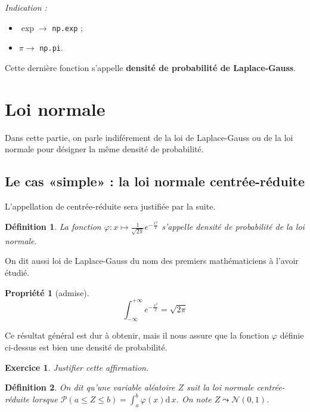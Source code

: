 \documentclass[11pt,a4paper,french]{article}
\makeatletter
\renewcommand{\maketitle}%
{\framebox{%
    \begin{minipage}{1.0\linewidth}%
      \begin{center}%
        \Large \@title ~-- \@author \\%
        \@date%
      \end{center}%
    \end{minipage}}%
  \normalsize%
}
\newcommand{\diff}[1]{\mathrm{d}\,#1}
\newcommand{\p}{\mathcal{P}}
\theoremstyle{break}
\newtheorem{definition}{Définition}
\newtheorem{propriete}{Propriété}
\theoremstyle{plain}
\newtheorem{exerciceT}{Exercice}
\theoremstyle{nonumberplain}
\theoremstyle{nonumberbreak}
\newenvironment{exercice}{\begin{framed}\begin{exerciceT}}{\end{exerciceT}\end{framed}}
\makeatother
\begin{document}
\emph{Indication :}
\begin{itemize}
  \item $\exp \to$ \texttt{np.exp} ;
  \item $\pi \to$ \texttt{np.pi}.
\end{itemize}

Cette dernière fonction s'appelle \textbf{densité de probabilité de
Laplace-Gauss}.
\pagebreak

\maketitle

\section{Loi normale}

Dans cette partie, on parle indiférement de la loi de Laplace-Gauss ou
de la loi normale pour désigner la même densité de probabilité.

\subsection{Le cas «simple» : la loi normale centrée-réduite}

L'appellation de centrée-réduite sera justifiée par la suite.

\begin{definition}
  La fonction $\varphi : x\mapsto \frac1{\sqrt{2\pi}}e^{-\frac{x^2}2}$
  s'appelle \emph{densité de probabilité de la loi normale}.
\end{definition}

On dit aussi loi de Laplace-Gauss du nom des premiers mathématiciens à
l'avoir étudié.

\begin{propriete}[admise]
  \[ \int_{-\infty}^{+\infty} e^{-\frac{x^2}2} = \sqrt{2\pi} \]
\end{propriete}

Ce résultat général est dur à obtenir, mais il nous assure que la
fonction $\varphi$ définie ci-dessus est bien une densité de
probabilité.

\begin{exercice}
  Justifier cette affirmation.
\end{exercice}

\begin{definition}
  On dit qu'une variable aléatoire $Z$ suit la loi normale
  centrée-réduite lorsque $\p(a\leqslant Z \leqslant b) = \int_a^b
  \varphi(x)\diff x$. On note $Z \leadsto \mathcal{N}(0,1)$.
\end{definition}
\end{document}
